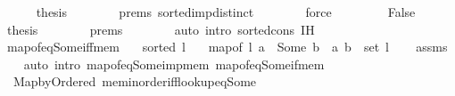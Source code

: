 \begin{isabellebody}
\ \ \ \ \isamarkupfalse%
\ {\isacharquery}{\kern0pt}thesis\isanewline
\ \ \ \ \ \ \isamarkupfalse%
\ {\isachardoublequoteopen}{}{\isachardot}{\kern0pt}prems{\isachardoublequoteclose}\ sorted{\isacharunderscore}{\kern0pt}imp{\isacharunderscore}{\kern0pt}distinct\isanewline
\ \ \ \ \ \ \isamarkupfalse%
\ force\isanewline
\ \ \isamarkupfalse%
\isanewline
\ \ \ \ \isamarkupfalse%
\ False\isanewline
\ \ \ \ \isamarkupfalse%
\ {\isacharquery}{\kern0pt}thesis\isanewline
\ \ \ \ \ \ \isamarkupfalse%
\ {\isachardoublequoteopen}{}{\isachardot}{\kern0pt}prems{\isachardoublequoteclose}\isanewline
\ \ \ \ \ \ \isamarkupfalse%
\ {\isacharparenleft}{\kern0pt}auto\ intro{\isacharcolon}{\kern0pt}\ sorted{\isacharunderscore}{\kern0pt}cons\ {\isachardoublequoteopen}{}{\isachardot}{\kern0pt}IH{\isachardoublequoteclose}{\isacharparenright}{\kern0pt}\isanewline
\ \ \isamarkupfalse%
\isanewline
{}\isamarkupfalse%
%
\endisatagproof
{\isafoldproof}%
%
\isadelimproof
\isanewline
%
\endisadelimproof
\isanewline
{}\isamarkupfalse%
\ map{\isacharunderscore}{\kern0pt}of{\isacharunderscore}{\kern0pt}eq{\isacharunderscore}{\kern0pt}Some{\isacharunderscore}{\kern0pt}iff{\isacharunderscore}{\kern0pt}mem{\isacharcolon}{\kern0pt}\isanewline
\ \ \ {\isachardoublequoteopen}sorted{}\ l{\isachardoublequoteclose}\isanewline
\ \ \ {\isachardoublequoteopen}map{\isacharunderscore}{\kern0pt}of\ l\ a\ {\isacharequal}{\kern0pt}\ Some\ b\ {\isasymlongleftrightarrow}\ {\isacharparenleft}{\kern0pt}a{\isacharcomma}{\kern0pt}\ b{\isacharparenright}{\kern0pt}\ {\isasymin}\ set\ l{\isachardoublequoteclose}\isanewline
%
\isadelimproof
\ \ %
\endisadelimproof
%
\isatagproof
{}\isamarkupfalse%
\ assms\isanewline
\ \ \isamarkupfalse%
\ {\isacharparenleft}{\kern0pt}auto\ intro{\isacharcolon}{\kern0pt}\ map{\isacharunderscore}{\kern0pt}of{\isacharunderscore}{\kern0pt}eq{\isacharunderscore}{\kern0pt}Some{\isacharunderscore}{\kern0pt}imp{\isacharunderscore}{\kern0pt}mem\ map{\isacharunderscore}{\kern0pt}of{\isacharunderscore}{\kern0pt}eq{\isacharunderscore}{\kern0pt}Some{\isacharunderscore}{\kern0pt}if{\isacharunderscore}{\kern0pt}mem{\isacharparenright}{\kern0pt}%
\endisatagproof
{\isafoldproof}%
%
\isadelimproof
\isanewline
%
\endisadelimproof
\isanewline
{}\isamarkupfalse%
\ {\isacharparenleft}{\kern0pt}\ Map{\isacharunderscore}{\kern0pt}by{\isacharunderscore}{\kern0pt}Ordered{\isacharparenright}{\kern0pt}\ mem{\isacharunderscore}{\kern0pt}inorder{\isacharunderscore}{\kern0pt}iff{\isacharunderscore}{\kern0pt}lookup{\isacharunderscore}{\kern0pt}eq{\isacharunderscore}{\kern0pt}Some{\isacharcolon}{\kern0pt}\isanewline

\end{isabellebody}
